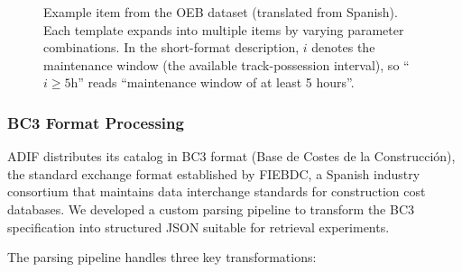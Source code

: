 \documentclass[preprint,review,12pt]{elsarticle}
\begin{document}
\begin{figure}[ht]
\centering
\small
{}
\caption{Example item from the OEB dataset (translated from Spanish). Each template expands into multiple items by varying parameter combinations. In the short-format description, $i$ denotes the maintenance window (the available track-possession interval), so ``$i \geq 5$h'' reads ``maintenance window of at least 5 hours''.}
\label{fig:oeb_example}
\end{figure}

\subsubsection{BC3 Format Processing}

ADIF distributes its catalog in BC3 format (Base de Costes de la Construcción), the standard exchange format established by FIEBDC, a Spanish industry consortium that maintains data interchange standards for construction cost databases. We developed a custom parsing pipeline to transform the BC3 specification into structured JSON suitable for retrieval experiments.

The parsing pipeline handles three key transformations:
\end{document}
